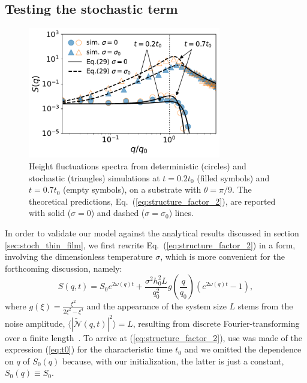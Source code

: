 \subsection{Testing the stochastic term}\label{subsec:validation}
\begin{figure}
    \centering
    \includegraphics[width=0.75\textwidth]{graphics/spectrum_theta_20_nob_fill_pattern.pdf}
    \caption{Height fluctuations spectra from deterministic (circles) and stochastic (triangles) simulations at $t=0.2 t_0$ (filled symbols) and $t=0.7 t_0$ (empty symbols), 
    on a substrate with $\theta =\pi/9$. The theoretical predictions, Eq.~(\ref{eq:structure_factor_2}), are reported with solid ($\sigma=0$) and dashed ($\sigma = \sigma_0$) lines.}
    \label{fig:theory_simulation_structure_factor}
\end{figure}
In order to validate our model against the analytical results discussed in section \ref{sec:stoch_thin_film}, we first rewrite Eq.~(\ref{eq:structure_factor_2}) in a form, involving the dimensionless temperature $\sigma$, which is more convenient for the forthcoming discussion, namely:
\begin{equation}\label{eq:structure_factor_2}
    S(q,t) = S_0 e^{2\omega(q)t} + \frac{\sigma^2 h_0^2 L}{q_0^2}g\left(\frac{q}{q_0}\right)(e^{2\omega(q)t} - 1),
\end{equation}
where $g(\xi) = \frac{\xi^2}{2\xi^2 - \xi^4}$ and the appearance of the system size $L$ stems from the noise amplitude, $\langle |\tilde{\mathcal{N}}(q,t)|^2 \rangle = L$, resulting from discrete Fourier-transforming over a finite length~\cite{zhangMolecularSimulationThin2019,zhangNanoscaleThinfilmFlows2020}. 
To arrive at (\ref{eq:structure_factor_2}), use was made of the expression (\ref{eq:t0}) for the characteristic time $t_0$ and we omitted the dependence on $q$ of $S_0(q)$ because, with our initialization, the latter is just a constant, $S_0(q)\equiv S_0$.
